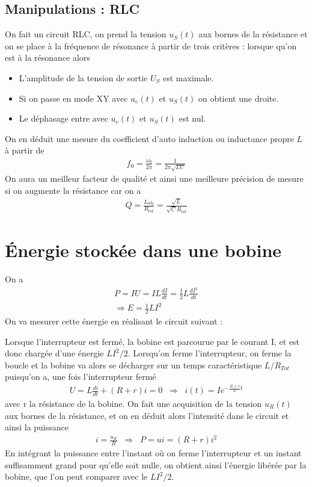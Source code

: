 \documentclass[12pt,prb,aps,epsf]{article}
\begin{document}
\subsection{Manipulations : RLC}
On fait un circuit RLC, on prend la tension $u_S(t)$ aux bornes de la résistance et on se place à la fréquence de résonance à partir de trois critères : lorsque qu'on est à la résonance alors
\begin{itemize}
	\item L'amplitude de la tension de sortie $U_S$ est maximale.
	\item Si on passe en mode XY avec $u_e(t)$ et $u_S(t)$ on obtient une droite.
	\item Le déphasage entre avec $u_e(t)$ et $u_S(t)$ est nul.
\end{itemize}	
On en déduit une mesure du coefficient d'auto induction ou inductance propre $L$ à partir de
\begin{eqnarray}
f_0 = \frac{\omega_0}{2\pi} = \frac{1}{2\pi\sqrt{LC}}
\end{eqnarray}
On aura un meilleur facteur de qualité et ainsi une meilleure précision de mesure si on augmente la résistance car on a 
\begin{eqnarray}
Q = \frac{L\omega_0}{R_{tot}} = \frac{\sqrt{L}}{\sqrt{C}R_{tot}}
\end{eqnarray}



\section{Énergie stockée dans une bobine}
On a 
\begin{eqnarray}
P = IU = IL\frac{dI}{dt} = \frac{1}{2}L\frac{dI^2}{dt}\\
\Longrightarrow E = \frac{1}{2}LI^2
\end{eqnarray}
On va mesurer cette énergie en réalisant le circuit suivant :


Lorsque l'interrupteur est fermé, la bobine est parcourue par le courant I, et est donc chargée d'une énergie $LI^2/2$. Lorsqu'on ferme l'interrupteur, on ferme la boucle et la bobine va alors se décharger sur un temps caractéristique $L/R_{Tot}$ puisqu'on a, une fois l'interrupteur fermé 
\begin{eqnarray}
U = L\frac{di}{dt} + (R+r)i = 0\;\;\Longrightarrow\;\; i(t) = Ie^{-\frac{R+r}{L}t}
\end{eqnarray}
avec r la résistance de la bobine. On fait une acquisition de la tension $u_R(t)$ aux bornes de la résistance, et on en déduit alors l'intensité dans le circuit et ainsi la puissance 
\begin{eqnarray}
i = \frac{u_R}{R} \;\;\Longrightarrow\;\; P = ui = (R+r)i^2
\end{eqnarray}
En intégrant la puissance entre l'instant où on ferme l'interrupteur et un instant suffisamment grand pour qu'elle soit nulle, on obtient ainsi l'énergie libérée par la bobine, que l'on peut comparer avec le $LI^2/2$.\\
\end{document}
